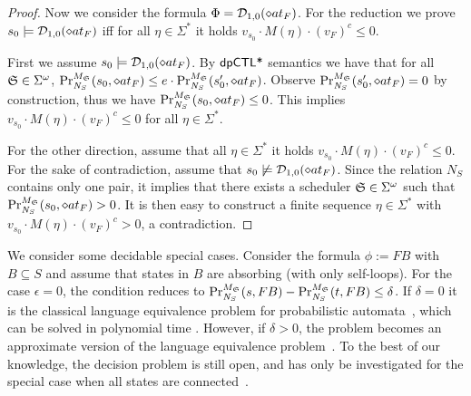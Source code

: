\begin{proof}
Now we consider the formula  $\Phi = \dpriv{1}{0} (\diamond at_F)$. For the reduction we prove $s_0\models \dpriv{1}{0} (\diamond at_F)$ iff for all $\eta\in\Sigma^*$ it holds $v_{s_0}\cdot M(\eta)\cdot (v_F)^c \leq 0$.

First we assume $s_0\models \dpriv{1}{0} (\diamond at_F)$. By $\dpCTLstar$ semantics we have that for all $\scheduler{S}\in\Sigma^\omega$,
$\myPr{s_0}{M_{\scheduler{S}}}{\neighbor{S}}{\diamond at_F} \leq
  e \cdot
  \myPr{s_0'}{M_{\scheduler{S}}}{\neighbor{S}}{\diamond at_F}$. Observe $\myPr{s_0'}{M_{\scheduler{S}}}{\neighbor{S}}{\diamond at_F}=0$ by construction, thus we have
$\myPr{s_0}{M_{\scheduler{S}}}{\neighbor{S}}{\diamond at_F} \leq
 0$. This implies  $v_{s_0}\cdot M(\eta)\cdot (v_F)^c \leq 0$ for all $\eta\in\Sigma^*$.
 
 For the other direction, assume that all $\eta\in\Sigma^*$ it holds $v_{s_0}\cdot M(\eta)\cdot (v_F)^c \leq 0$. For the sake of contradiction, assume that $s_0\not\models \dpriv{1}{0} (\diamond at_F)$. Since the relation $N_S$ contains only one pair, it implies that there exists a scheduler $\scheduler{S}\in\Sigma^\omega$ such that $\myPr{s_0}{M_{\scheduler{S}}}{\neighbor{S}}{\diamond at_F} >0$. It is then easy to construct a finite sequence $\eta\in\Sigma^*$ with  $v_{s_0}\cdot M(\eta)\cdot (v_F)^c > 0$, a contradiction.
\end{proof}

We consider some decidable special cases. Consider the formula $\phi:=F B$ with $B\subseteq S$ and assume that states in $B$ are absorbing (with only self-loops). For the case $\epsilon=0$, the condition reduces to
$\myPr{s}{M_{\scheduler{S}}}{\neighbor{S}}{F B} -
\myPr{t}{M_{\scheduler{S}}}{\neighbor{S}}{F B}\le \delta$. If $\delta=0$ it is the classical language equivalence problem for probabilistic automata~\cite{Rabin63}, which can be solved in polynomial time \cite{Tzeng92}. However, if $\delta>0$, the problem
becomes an approximate version of the language equivalence problem~\cite{Tzeng92}. To the best of our knowledge, the decision problem is still open, and has only be investigated for the special case when all states are connected~\cite{Tzeng92}. 

